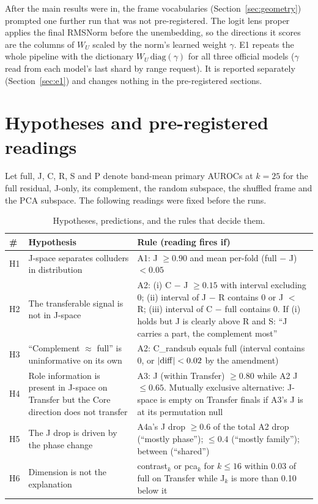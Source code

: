 \documentclass[11pt,a4paper]{article}
\newcommand{\WU}{W_U}
\begin{document}
After the main results were in, the frame vocabularies (Section~\ref{sec:geometry}) prompted one further run that was not pre-registered. The logit lens proper applies the final RMSNorm before the unembedding, so the directions it scores are the columns of $\WU$ scaled by the norm's learned weight $\gamma$. E1 repeats the whole pipeline with the dictionary $\WU\,\mathrm{diag}(\gamma)$ for all three official models ($\gamma$ read from each model's last shard by range request). It is reported separately (Section~\ref{sec:e1}) and changes nothing in the pre-registered sections.

\section{Hypotheses and pre-registered readings}
\label{sec:hyp}

Let full, J, C, R, S and P denote band-mean primary AUROCs at $k=25$ for the full residual, J-only, its complement, the random subspace, the shuffled frame and the PCA subspace. The following readings were fixed before the runs.

\begin{table}[t]
\centering
\caption{Hypotheses, predictions, and the rules that decide them.}
\label{tab:hyp}
\small
\begin{tabularx}{\textwidth}{@{}l>{\raggedright\arraybackslash}X>{\raggedright\arraybackslash}X@{}}
\toprule
\textbf{\#} & \textbf{Hypothesis} & \textbf{Rule (reading fires if)} \\
\midrule
H1 & J-space separates colluders in distribution & A1: J $\ge 0.90$ and mean per-fold (full $-$ J) $<0.05$ \\
H2 & The transferable signal is not in J-space & A2: (i) C $-$ J $\ge 0.15$ with interval excluding 0; (ii) interval of J $-$ R contains 0 or J $<$ R; (iii) interval of C $-$ full contains 0. If (i) holds but J is clearly above R and S: ``J carries a part, the complement most'' \\
H3 & ``Complement $\approx$ full'' is uninformative on its own & A2: C\_randsub equals full (interval contains 0, or $|{\rm diff}|<0.02$ by the amendment) \\
H4 & Role information is present in J-space on Transfer but the Core direction does not transfer & A3: J (within Transfer) $\ge 0.80$ while A2 J $\le 0.65$. Mutually exclusive alternative: J-space is empty on Transfer finals if A3's J is at its permutation null \\
H5 & The J drop is driven by the phase change & A4a's J drop $\ge 0.6$ of the total A2 drop (``mostly phase''); $\le 0.4$ (``mostly family''); between (``shared'') \\
H6 & Dimension is not the explanation & contrast$_k$ or pca$_k$ for $k\le 16$ within 0.03 of full on Transfer while J$_k$ is more than 0.10 below it \\
\bottomrule
\end{tabularx}
\end{table}
\end{document}
